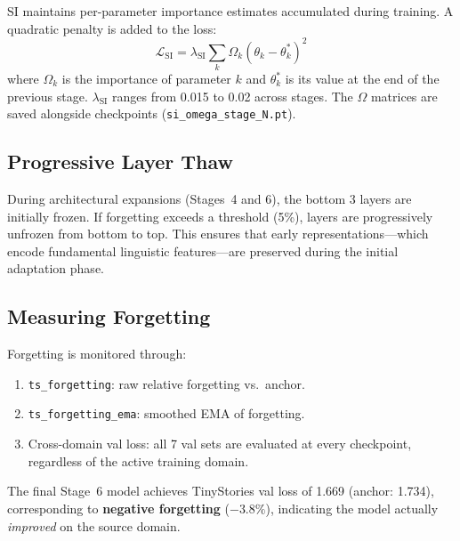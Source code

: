 SI maintains per-parameter importance estimates accumulated during training.
A quadratic penalty is added to the loss:
\[
\mathcal{L}_\text{SI} = \lambda_\text{SI} \sum_k \Omega_k (\theta_k - \theta_k^*)^2
\]
where $\Omega_k$ is the importance of parameter $k$ and $\theta_k^*$ is its
value at the end of the previous stage.  $\lambda_\text{SI}$ ranges from
0.015 to 0.02 across stages.  The $\Omega$ matrices are saved alongside
checkpoints (\texttt{si\_omega\_stage\_N.pt}).

\subsection{Progressive Layer Thaw}

During architectural expansions (Stages~4 and 6), the bottom 3 layers are
initially frozen.  If forgetting exceeds a threshold (5\%), layers are
progressively unfrozen from bottom to top.  This ensures that early
representations---which encode fundamental linguistic features---are
preserved during the initial adaptation phase.

\subsection{Measuring Forgetting}

Forgetting is monitored through:
\begin{enumerate}[nosep]
  \item \texttt{ts\_forgetting}: raw relative forgetting vs.\ anchor.
  \item \texttt{ts\_forgetting\_ema}: smoothed EMA of forgetting.
  \item Cross-domain val loss: all 7 val sets are evaluated at every
        checkpoint, regardless of the active training domain.
\end{enumerate}
\vspace{2pt}
The final Stage~6 model achieves TinyStories val loss of 1.669
(anchor: 1.734), corresponding to \textbf{negative forgetting} ($-3.8\%$),
indicating the model actually \emph{improved} on the source domain.
